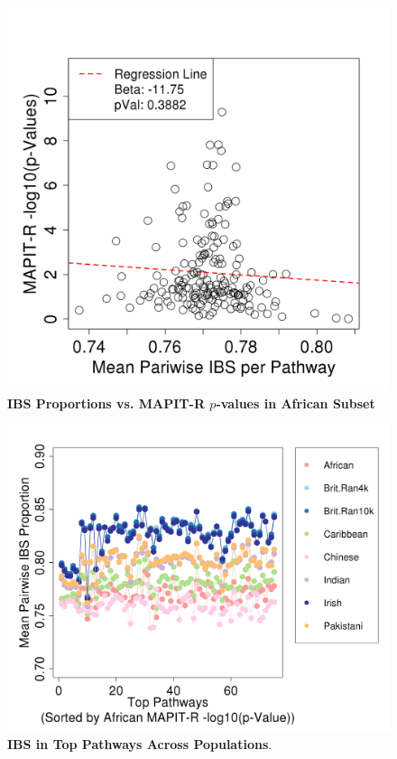 \documentclass[12pt, a4paper]{article}
\begin{document}
\begin{figure}[htbp]
\centering
\includegraphics[scale=.35]{Images/Main/InterPath_Main_Figure_IBS_vs2_AfrHght.png}
\caption[TBD]{\textbf{IBS Proportions vs. MAPIT-R $p$-values in African Subset}}
\label{InterPath-Main-Figure-IBS-AfrHght}
\end{figure}

\begin{figure}[htbp]
\centering
\includegraphics[scale=.35]{Images/Main/InterPath_Main_Figure_IBS_AllPopComps_vs2_AfrHght.png}
\caption[TBD]{\textbf{IBS in Top Pathways Across Populations}.}
\label{InterPath-Main-Figure-IBS-AllPopComps-AfrHght}
\end{figure}
\end{document}
